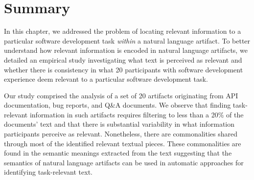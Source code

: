 \section{Summary}
\label{cp3:summary}



In this chapter, we addressed the problem of locating relevant information
to a particular software development task \textit{within} a natural language artifact.
To better understand how relevant information is encoded in natural language artifacts,
we detailed an empirical study investigating what text is perceived as relevant
and whether there is consistency in what 20 participants with software development experience deem relevant
to a particular software development task.


Our study comprised the analysis of a set of 20 artifacts originating from API documentation, bug reports, and Q\&A documents.
We observe that finding task-relevant information in such artifacts requires filtering to less than
a 20\% of the documents' text and that there is substantial variability in what information participants perceive as relevant.
Nonetheless, there are commonalities shared through most of the identified relevant textual pieces.
These commonalities are found in the semantic meanings extracted from the text suggesting that
the semantics of natural language artifacts  
can be used in automatic approaches for identifying task-relevant text.
